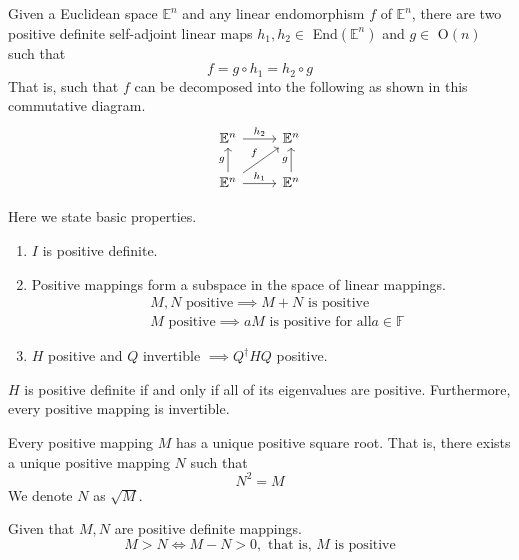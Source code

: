 \documentclass{article}
\begin{document}
    \begin{theorem}
    Given a Euclidean space $\mathbb{E}^n$ and any linear endomorphism $f$ of $\mathbb{E}^n$, there are two positive definite self-adjoint linear maps $h_1, h_2 \in$ End$(\mathbb{E}^n)$ and $g \in$ O$(n)$ such that
    \[f = g \circ h_1 = h_2 \circ g\]
    That is, such that $f$ can be decomposed into the following as shown in this commutative diagram. 
    \[\begin{tikzcd}
    \mathbb{E}^n \arrow{r}{h_2} & \mathbb{E}^n \\
    \mathbb{E}^n \arrow{u}{g} \arrow{ur}{f} \arrow{r}{h_1} & \mathbb{E}^n \arrow{u}{g}
    \end{tikzcd}\]
    \end{theorem}

    \begin{theorem} Here we state basic properties. 
    \begin{enumerate}
        \item $I$ is positive definite. 
        \item Positive mappings form a subspace in the space of linear mappings. 
    \begin{align*}
        &M, N \text{ positive} \implies M + N \text{ is positive} \\
        &M \text{ positive} \implies a M \text{ is positive for all} a \in \mathbb{F}
    \end{align*}
        \item $H$ positive and $Q$ invertible $\implies Q^\dagger H Q$ positive. 
    \end{enumerate}
    \end{theorem}

    \begin{theorem}
    $H$ is positive definite if and only if all of its eigenvalues are positive. Furthermore, every positive mapping is invertible.
    \end{theorem}

    \begin{theorem}
    Every positive mapping $M$ has a unique positive square root. That is, there exists a unique positive mapping $N$ such that
    \[ N^2 = M \]
    We denote $N$ as $\sqrt{M}$. 
    \end{theorem}

    \begin{definition}
    Given that $M, N$ are positive definite mappings. 
    \[M > N \iff M - N > 0, \text{ that is, $M$ is positive}\]
    \end{definition}
\end{document}
